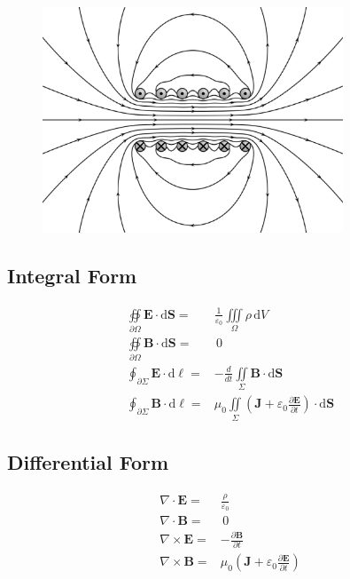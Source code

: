\documentclass[letterpaper,10pt,titlepage]{article}
\numberwithin{equation}{section}
\begin{document}
\begin{figure}[h!]
  \centering
    \includegraphics[width=0.8\textwidth,height=0.4\textheight]{maxwell.eps}
\end{figure}

\subsection*{Integral Form}

\begin{align}
  \oiint\limits_{\partial \Omega} \mathbf{E} \cdot \mathrm{d}\mathbf{S} =&
    \frac{1}{\varepsilon_0} \iiint\limits_{\Omega} \rho\, \mathrm{d}V \\
  \oiint\limits_{\partial \Omega} \mathbf{B} \cdot \mathrm{d}\mathbf{S} =&\, 0\\
  \oint_{\partial \Sigma} \mathbf{E} \cdot \mathrm{d}\ell =&
    -\frac{d}{dt}\iint\limits_{\Sigma}\mathbf{B} \cdot \mathrm{d}\mathbf{S} \\
  \oint_{\partial \Sigma} \mathbf{B} \cdot \mathrm{d}\ell =& \mu_0
      \iint\limits_{\Sigma}
      \left(
        \mathbf{J} + \varepsilon_0 \frac{\partial\mathbf{E}}{\partial t}
      \right)
      \cdot \mathrm{d}\mathbf{S}
\end{align}

\subsection*{Differential Form}

\begin{align}
  \nabla \cdot \mathbf{E} =& \frac{\rho}{\varepsilon_0}\\
  \nabla \cdot \mathbf{B} =&\, 0\\
  \nabla \times \mathbf{E} =& - \frac{\partial\mathbf{B}}{\partial t}\\
  \nabla \times \mathbf{B} =& \mu_0
      \left(
        \mathbf{J} + \varepsilon_0 \frac{\partial\mathbf{E}}{\partial t}
      \right)
\end{align}
\end{document}
